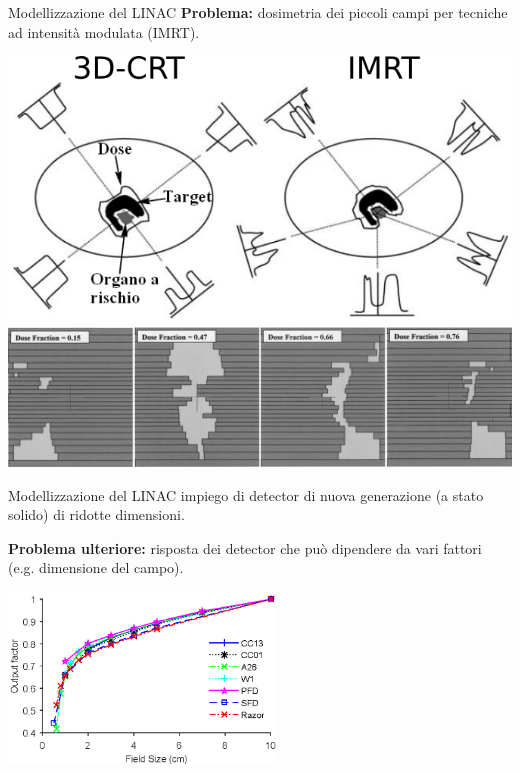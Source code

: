 \documentclass{beamer}
\begin{document}
\begin{frame}[t]{Modellizzazione del LINAC}
\footnotesize
\alert{\textbf{Problema:}} dosimetria dei piccoli campi per tecniche ad intensità modulata (IMRT).
\begin{center}
\includegraphics[width=.6\textwidth]{../cap2/3D_IMRT.png}\\\vspace{.3cm}
\includegraphics[width=.6\textwidth]{../cap2/IMRT_Segments_2.jpg}
\end{center}
\end{frame}



\begin{frame}[t]{Modellizzazione del LINAC}
\footnotesize
{} impiego di detector di nuova generazione (a stato solido) di ridotte dimensioni.\\ \vspace{.5cm}

\alert{\bf Problema ulteriore:} risposta dei detector che può dipendere da vari fattori (e.g. dimensione del campo).\\ \vspace{.3cm}

\includegraphics[height=4.6cm]{./img/OF_Empty.eps}

\end{frame}
\end{document}

